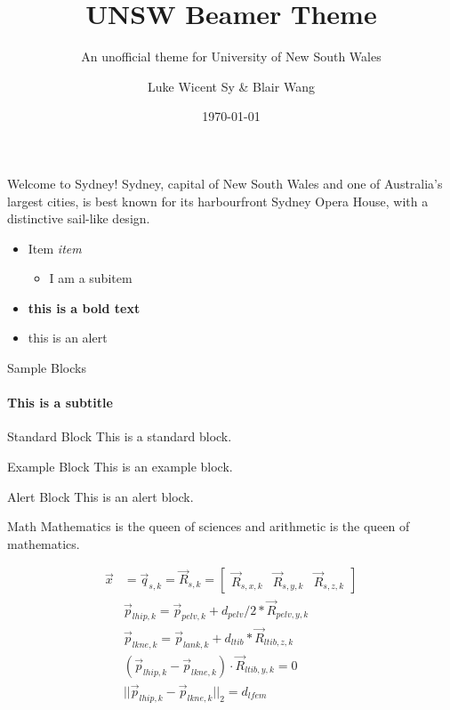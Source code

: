 \documentclass[aspectratio=169]{beamer}
\author{Luke Wicent Sy \& Blair Wang}
\title{UNSW Beamer Theme}
\subtitle{An unofficial theme for University of New South Wales}
\institute{Graduate School of Biomedical Engineering \& UNSW Business School}
\date{\today}
\begin{document}
	\begin{frame}[plain]
		\titlepage
	\end{frame}
	
	\begin{frame}{Welcome to Sydney!}
	Sydney, capital of New South Wales and one of Australia's largest cities, is best known for its harbourfront Sydney Opera House, with a distinctive sail-like design.
		\begin{itemize}
			\item Item \textit{item}
				\begin{itemize}
					\item I am a subitem
				\end{itemize}
			\item \textbf{this is a bold text}
			\item \alert{this is an alert}
		\end{itemize}
	\end{frame}

	\begin{frame}{Sample Blocks}
		\framesubtitle{This is a subtitle}
		\begin{block}{Standard Block}
			This is a standard block.
		\end{block}
		
		\begin{exampleblock}{Example Block}
			This is an example block.
		\end{exampleblock}
		
		\begin{alertblock}{Alert Block}
			This is an alert block.
		\end{alertblock}
	\end{frame}
	
	\begin{frame}{Math}
		Mathematics is the queen of sciences and arithmetic is the queen of mathematics.

		\begin{align*}
			\vec{x} &= \vec{q}_{s, k} = \vec{R}_{s, k} = 
			\begin{bmatrix}
			\vec{R}_{s, x, k} & \vec{R}_{s, y, k} & \vec{R}_{s, z, k}
			\end{bmatrix} \\
			& \vec{p}_{lhip, k} = \vec{p}_{pelv, k} + d_{pelv}/2*\vec{R}_{pelv, y, k} \\
			& \vec{p}_{lkne, k} = \vec{p}_{lank, k} + d_{ltib}*\vec{R}_{ltib, z, k} \\
			& (\vec{p}_{lhip, k} - \vec{p}_{lkne, k} ) \cdot \vec{R}_{ltib, y, k} = 0\\
			& ||\vec{p}_{lhip, k} - \vec{p}_{lkne, k}||_2 = d_{lfem}
		\end{align*}	
		
		
	\end{frame}
\end{document}
